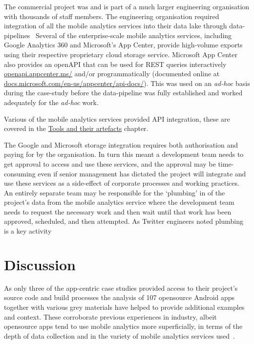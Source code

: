 The commercial project was and is part of a much larger engineering organisation with thousands of staff members. The engineering organisation required integration of all the mobile analytics services into their data lake through data-pipelines~ Several of the enterprise-scale mobile analytics services, including Google Analytics 360 and Microsoft's App Center, provide high-volume exports using their respective proprietary cloud storage service. Microsoft App Center also provides an openAPI that can be used for REST queries interactively \href{https://openapi.appcenter.ms/}{openapi.appcenter.ms/} and/or programmatically (documented online at \href{https://docs.microsoft.com/en-us/appcenter/api-docs/}{docs.microsoft.com/en-us/appcenter/api-docs/}). This was used on an \emph{ad-hoc} basis during the case-study before the data-pipeline was fully established and worked adequately for the \emph{ad-hoc} work.  

Various of the mobile analytics services provided API integration, these are covered in the \href{chapter-tools-and-their-artefacts}{Tools and their artefacts} chapter.

The Google and Microsoft storage integration requires both authorisation and paying for by the organisation. In turn this meant a development team needs to get approval to access and use these services, and the approval may be time-consuming even if senior management has dictated the project will integrate and use these services as a side-effect of corporate processes and working practices. An entirely separate team may be responsible for the `plumbing' in of the project's data from the mobile analytics service where the development team needs to request the necessary work and then wait until that work has been approved, scheduled, and then attempted. As Twitter engineers noted plumbing is a key activity~ 


\section{Discussion}
As only three of the app-centric case studies provided access to their project's source code and build processes the analysis of 107 opensource Android apps together with various grey materials have helped to provide additional examples and context. These corroborate previous experiences in industry, albeit opensource apps tend to use mobile analytics more superficially, in terms of the depth of data collection and in the variety of mobile analytics services used~.

